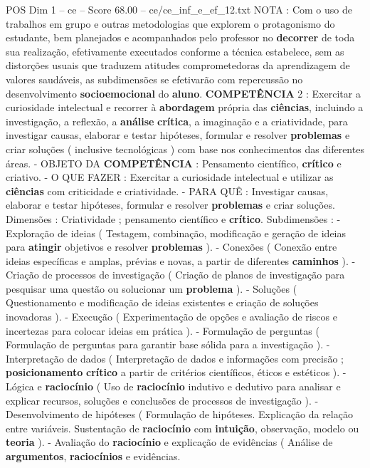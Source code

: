 \begin{textsample}{POS Dim 1 – ce – Score 68.00 – ce/ce\_inf\_e\_ef\_12.txt}
NOTA : Com o uso de trabalhos em grupo e outras metodologias que explorem o protagonismo do estudante, bem planejados e acompanhados pelo professor no \textbf{decorrer} de toda sua realização, efetivamente executados conforme a técnica estabelece, sem as distorções usuais que traduzem atitudes comprometedoras da aprendizagem de valores saudáveis, as subdimensões se efetivarão com repercussão no desenvolvimento \textbf{socioemocional} do \textbf{aluno}. \textbf{COMPETÊNCIA} 2 : Exercitar a curiosidade intelectual e recorrer à \textbf{abordagem} própria das \textbf{ciências}, incluindo a investigação, a reflexão, a \textbf{análise} \textbf{crítica}, a imaginação e a criatividade, para investigar causas, elaborar e testar hipóteses, formular e resolver \textbf{problemas} e criar soluções ( inclusive tecnológicas ) com base nos conhecimentos das diferentes áreas. - OBJETO DA \textbf{COMPETÊNCIA} : Pensamento científico, \textbf{crítico} e criativo. - O QUE FAZER : Exercitar a curiosidade intelectual e utilizar as \textbf{ciências} com criticidade e criatividade. - PARA QUÊ : Investigar causas, elaborar e testar hipóteses, formular e resolver \textbf{problemas} e criar soluções.
Dimensões : Criatividade ; pensamento científico e \textbf{crítico}.
Subdimensões : - Exploração de ideias ( Testagem, combinação, modificação e geração de ideias para \textbf{atingir} objetivos e resolver \textbf{problemas} ). - Conexões ( Conexão entre ideias específicas e amplas, prévias e novas, a partir de diferentes \textbf{caminhos} ). - Criação de processos de investigação ( Criação de planos de investigação para pesquisar uma questão ou solucionar um \textbf{problema} ). - Soluções ( Questionamento e modificação de ideias existentes e criação de soluções inovadoras ). - Execução ( Experimentação de opções e avaliação de riscos e incertezas para colocar ideias em prática ). - Formulação de perguntas ( Formulação de perguntas para garantir base sólida para a investigação ). - Interpretação de dados ( Interpretação de dados e informações com precisão ; \textbf{posicionamento} \textbf{crítico} a partir de critérios científicos, éticos e estéticos ). - Lógica e \textbf{raciocínio} ( Uso de \textbf{raciocínio} indutivo e dedutivo para analisar e explicar recursos, soluções e conclusões de processos de investigação ). - Desenvolvimento de hipóteses ( Formulação de hipóteses.
Explicação da relação entre variáveis.
Sustentação de \textbf{raciocínio} com \textbf{intuição}, observação, modelo ou \textbf{teoria} ). - Avaliação do \textbf{raciocínio} e explicação de evidências ( Análise de \textbf{argumentos}, \textbf{raciocínios} e evidências.

\end{textsample}
